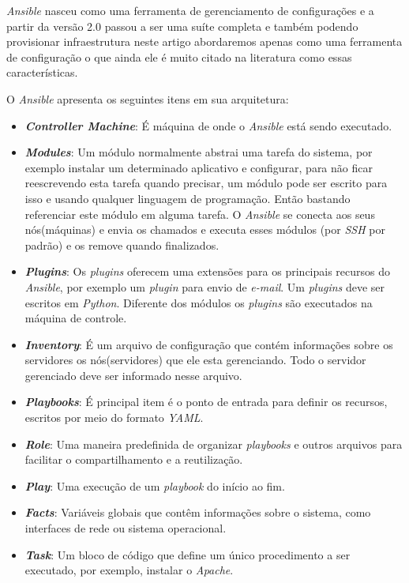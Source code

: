 \textit{Ansible} nasceu como uma ferramenta de gerenciamento de configurações e a partir da versão 2.0 passou a ser uma suíte completa e também podendo provisionar infraestrutura neste artigo abordaremos apenas como uma ferramenta de configuração o que ainda ele é muito citado na literatura como essas características.

 O \textit{Ansible} apresenta os seguintes itens em sua arquitetura:

\hfill
 \begin{itemize}
\item \textbf{\textit{Controller Machine}}: É máquina de onde o \textit{Ansible} está sendo executado. 

\item \textbf{\textit{Modules}}: Um módulo normalmente abstrai uma tarefa do sistema, por exemplo instalar um determinado aplicativo e configurar, para não ficar reescrevendo esta tarefa quando precisar, um módulo pode ser escrito para isso e usando qualquer linguagem de programação. Então bastando referenciar este módulo em alguma tarefa. O \textit{Ansible} se conecta aos seus nós(máquinas) e envia os chamados e executa esses módulos (por \textit{SSH} por padrão) e os remove quando finalizados.   

\item \textbf{\textit{Plugins}}: Os \textit{plugins} oferecem uma extensões para os principais recursos do \textit{Ansible}, por exemplo um \textit{plugin} para envio de \textit{e-mail}. Um \textit{plugins} deve ser escritos em \textit{Python}. Diferente dos módulos os \textit{plugins} são executados na máquina de controle.

\item \textbf{\textit{Inventory}}: É um arquivo de configuração que contém informações sobre os servidores os nós(servidores) que ele esta gerenciando. Todo o servidor gerenciado deve ser informado nesse arquivo.

\item \textbf{\textit{Playbooks}}: É principal item é o ponto de entrada para definir os recursos, escritos por meio do formato \textit{YAML}.

\item \textbf{\textit{Role}}: Uma maneira predefinida de organizar \textit{playbooks} e outros arquivos para facilitar o compartilhamento e a reutilização.

\item \textbf{\textit{Play}}: Uma execução de um \textit{playbook} do início ao fim.

\item \textbf{\textit{Facts}}: Variáveis globais que contêm informações sobre o sistema, como interfaces de rede ou sistema operacional.

\item \textbf{\textit{Task}}: Um bloco de código que define um único procedimento a ser executado, por exemplo, instalar o \textit{Apache}.
 \end{itemize}
